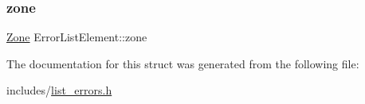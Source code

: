 \mbox{\label{structErrorListElement_a64696b98a5f211dff6ced86e55cf8fe4}} 
\subsubsection{\texorpdfstring{zone}{zone}}
{\footnotesize\ttfamily \hyperlink{structZone}{Zone} Error\+List\+Element\+::zone}



The documentation for this struct was generated from the following file\+:\begin{DoxyCompactItemize}
\item 
includes/\hyperlink{list__errors_8h}{list\+\_\+errors.\+h}\end{DoxyCompactItemize}
